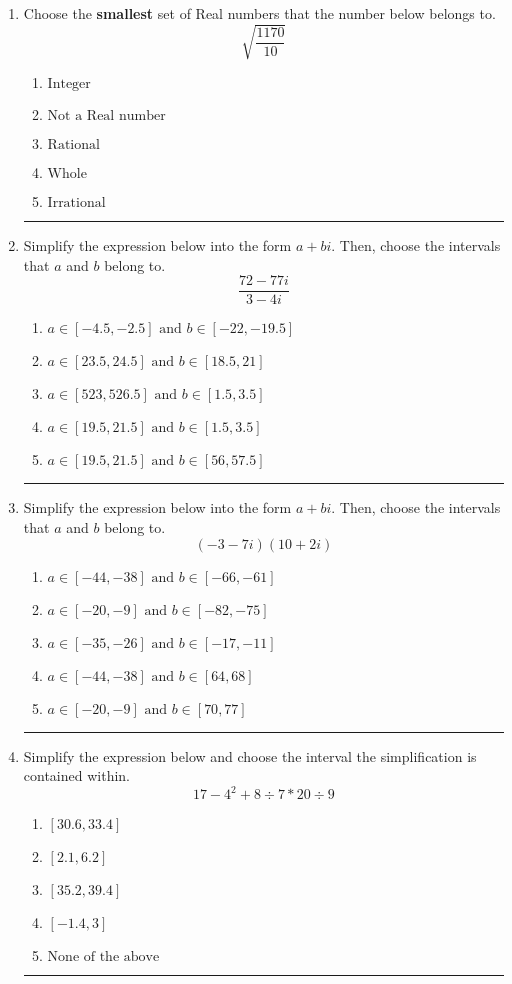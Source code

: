 \documentclass[14pt]{extbook}
\newcommand{\litem}[1]{\item#1\hspace*{-1cm}\rule{\textwidth}{0.4pt}}
\begin{document}
\begin{enumerate}
{\begin{enumerate}[label=\Alph*.]
\end{enumerate} }
\litem{
Choose the \textbf{smallest} set of Real numbers that the number below belongs to.\[ \sqrt{\frac{1170}{10}} \]\begin{enumerate}[label=\Alph*.]
\item \( \text{Integer} \)
\item \( \text{Not a Real number} \)
\item \( \text{Rational} \)
\item \( \text{Whole} \)
\item \( \text{Irrational} \)

\end{enumerate} }
\litem{
Simplify the expression below into the form $a+bi$. Then, choose the intervals that $a$ and $b$ belong to.\[ \frac{72 - 77 i}{3 - 4 i} \]\begin{enumerate}[label=\Alph*.]
\item \( a \in [-4.5, -2.5] \text{ and } b \in [-22, -19.5] \)
\item \( a \in [23.5, 24.5] \text{ and } b \in [18.5, 21] \)
\item \( a \in [523, 526.5] \text{ and } b \in [1.5, 3.5] \)
\item \( a \in [19.5, 21.5] \text{ and } b \in [1.5, 3.5] \)
\item \( a \in [19.5, 21.5] \text{ and } b \in [56, 57.5] \)

\end{enumerate} }
\litem{
Simplify the expression below into the form $a+bi$. Then, choose the intervals that $a$ and $b$ belong to.\[ (-3 - 7 i)(10 + 2 i) \]\begin{enumerate}[label=\Alph*.]
\item \( a \in [-44, -38] \text{ and } b \in [-66, -61] \)
\item \( a \in [-20, -9] \text{ and } b \in [-82, -75] \)
\item \( a \in [-35, -26] \text{ and } b \in [-17, -11] \)
\item \( a \in [-44, -38] \text{ and } b \in [64, 68] \)
\item \( a \in [-20, -9] \text{ and } b \in [70, 77] \)

\end{enumerate} }
\litem{
Simplify the expression below and choose the interval the simplification is contained within.\[ 17 - 4^2 + 8 \div 7 * 20 \div 9 \]\begin{enumerate}[label=\Alph*.]
\item \( [30.6, 33.4] \)
\item \( [2.1, 6.2] \)
\item \( [35.2, 39.4] \)
\item \( [-1.4, 3] \)
\item \( \text{None of the above} \)


\end{enumerate}}
\end{enumerate}
\end{document}
